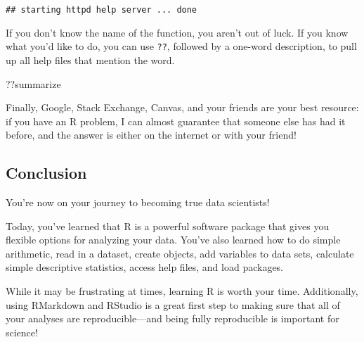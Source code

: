 \documentclass[
]{article}
\newenvironment{Shaded}{\begin{snugshade}}{\end{snugshade}}
\newcommand{\NormalTok}[1]{#1}
\begin{document}
\begin{verbatim}
## starting httpd help server ... done
\end{verbatim}

If you don't know the name of the function, you aren't out of luck. If
you know what you'd like to do, you can use \texttt{??}, followed by a
one-word description, to pull up all help files that mention the word.

\begin{Shaded}
\begin{Highlighting}[]
\NormalTok{??summarize}
\end{Highlighting}
\end{Shaded}

Finally, Google, Stack Exchange, Canvas, and your friends are your best
resource: if you have an R problem, I can almost guarantee that someone
else has had it before, and the answer is either on the internet or with
your friend!

\hypertarget{conclusion}{%
\subsection{Conclusion}\label{conclusion}}

You're now on your journey to becoming true data scientists!

Today, you've learned that R is a powerful software package that gives
you flexible options for analyzing your data. You've also learned how to
do simple arithmetic, read in a dataset, create objects, add variables
to data sets, calculate simple descriptive statistics, access help
files, and load packages.

While it may be frustrating at times, learning R is worth your time.
Additionally, using RMarkdown and RStudio is a great first step to
making sure that all of your analyses are reproducible---and being fully
reproducible is important for science!
\end{document}
